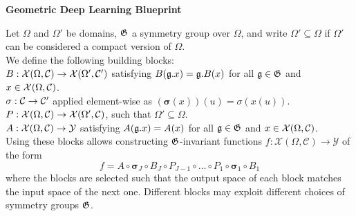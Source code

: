 \begin{tcolorbox}[width=\linewidth,
                  boxsep=0pt,
                  left=7.5pt,
                  right=7.5pt,
                  top=7.5pt,
                  bottom=7.5pt,
                  arc=0pt,
                  boxrule=0pt,toprule=0pt,
                  colback=boxgray,
                  ]%
    
\begin{center}
\textbf{Geometric Deep Learning Blueprint}
\end{center}
Let $\Omega$ and $\Omega'$ be domains, ${\mathfrak{G}}$ a symmetry group over $\Omega$, and write $\Omega' \subseteq \Omega$ if $\Omega'$ can be considered a compact version of $\Omega$. \\

We define the following building blocks:\vspace{2mm}\\

     $B: {\mathcal{X}}(\Omega, {\mathcal{C}}) \to {\mathcal{X}}( \Omega', {\mathcal{C}}')$ satisfying $B({\mathfrak{g}}.x) = {\mathfrak{g}}.B(x)$ for all ${\mathfrak{g}} \in {\mathfrak{G}}$ and $x\in {\mathcal{X}}(\Omega,\mathcal{C})$.\vspace{2mm}\\

     $\sigma: {\mathcal{C}} \to {\mathcal{C}}'$ applied element-wise as $(\bm{\sigma}(x))(u) = \sigma( x(u))$.\vspace{2mm}\\

      $P : {\mathcal{X}}(\Omega, {\mathcal{C}}) \rightarrow {\mathcal{X}}(\Omega', {\mathcal{C}}) $, such that $\Omega'\subseteq\Omega$.\vspace{2mm}\\
    
     $A: {\mathcal{X}}(\Omega, {\mathcal{C}}) \rightarrow \mathcal{Y}$ satisfying $A({\mathfrak{g}} .x) = A(x)$ for all ${\mathfrak{g}} \in {\mathfrak{G}}$ and $x\in {\mathcal{X}}(\Omega,\mathcal{C})$.\vspace{2mm}\\

Using these blocks allows constructing ${\mathfrak{G}}$-invariant functions $f:\mathcal{X}(\Omega,\mathcal{C}) \rightarrow \mathcal{Y}$ of the form 
$$
f = A \circ \boldsymbol{\sigma}_J \circ B_J \circ P_{J-1} \circ \hdots \circ P_1 \circ \boldsymbol{\sigma}_1 \circ B_1
$$
where the blocks are selected such that the output space of each block matches the input space of the next one. Different blocks may exploit different choices of symmetry groups ${\mathfrak{G}}$.
\end{tcolorbox}

